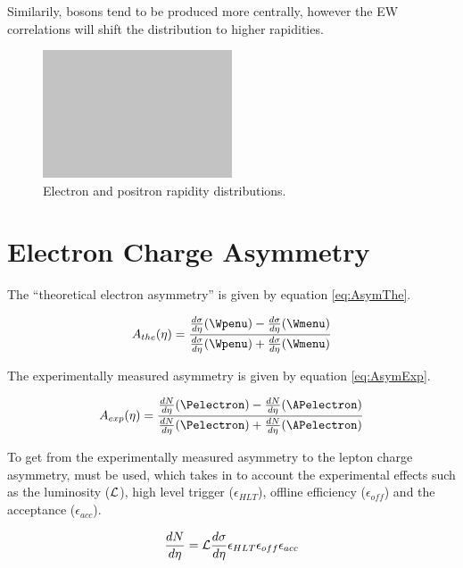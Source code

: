 Similarily, \PWm bosons tend to be produced more centrally, however the EW
correlations will shift the distribution to higher rapidities.

\begin{figure}[htb]
  \centering
  \includegraphics[width=0.5\textwidth]{placeholder}
  \caption{Electron and positron rapidity distributions.}
  \label{wbos:leptonrapidity}
\end{figure}

\section{Electron Charge Asymmetry}

\cite{phenom} The ``theoretical electron asymmetry'' is given by equation
\ref{eq:AsymThe}.

\begin{equation}
A_{the}(\eta)=\frac{  \frac{d\sigma}{d\eta}(\Wpenu) -
\frac{d\sigma}{d\eta}(\Wmenu) }{ \frac{d\sigma}{d\eta}(\Wpenu) +
\frac{d\sigma}{d\eta}(\Wmenu) }
\label{eq:AsymThe}
\end{equation} 

The experimentally measured asymmetry is given by equation
\ref{eq:AsymExp}.\cite{kom}
 
\begin{equation}
A_{exp}(\eta)=\frac{  \frac{dN}{d\eta}(\Pelectron) -
\frac{dN}{d\eta}(\APelectron) }{ \frac{dN}{d\eta}(\Pelectron) +
\frac{dN}{d\eta}(\APelectron) }
\label{eq:AsymExp}
\end{equation} 

To get from the experimentally measured asymmetry to the lepton charge
asymmetry,  must be used, which takes in to
account the experimental effects such as the luminosity (${\cal L}$), high
level trigger ($\epsilon_{HLT}$), offline efficiency ($ \epsilon_{off}$) and
the acceptance ($\epsilon_{acc}$).

\begin{equation}
\frac{dN}{d\eta} = {\cal L } \frac{d\sigma}{d\eta}  \epsilon_{HLT}
\epsilon_{off} \epsilon_{acc}
\label{eq:NumEve}
\end{equation} 

